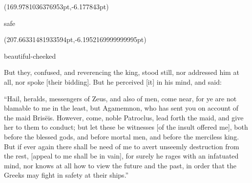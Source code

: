 \documentclass{ransom}
\begin{document}
\begin{foreignpage}
{\begin{textblock*}{21.43687pt}(169.9781036376953pt,\pdfpageheight-206.37759399414062pt-6.177843pt)\parbox[b]{21.43687pt}{\begin{blacktext}\begin{latin}safe\end{latin}\end{blacktext}}\end{textblock*}
\begin{textblock*}{66.25943pt}(207.66331481933594pt,\pdfpageheight-152.37759399414062pt-6.1952169999999995pt)\parbox[b]{66.25943pt}{\begin{blacktext}\begin{latin}beautiful-cheeked\end{latin}\end{blacktext}}\end{textblock*}
 }
\end{foreignpage}


But
they, confused, and reverencing the king, stood still, nor addressed
him at all, nor spoke [their bidding]. But he perceived [it] in his
mind, and said:

“Hail, heralds, messengers of Zeus, and also of men, come near, for
ye are not blamable to me in the least, but Agamemnon, who has sent you
on account of the maid Brisëis. However, come, noble Patroclus, lead
forth the maid, and give her to them to conduct; but let these be
witnesses [of the insult offered me], both before the blessed gods, and
before mortal men, and before the merciless king. But if ever again
there shall be need of me to avert unseemly destruction from the rest,
[appeal to me shall be in vain], for surely he rages with an
infatuated mind, nor knows at all how to view the future and the past,
in order that the Greeks may fight in safety at their ships.”
\end{document}
